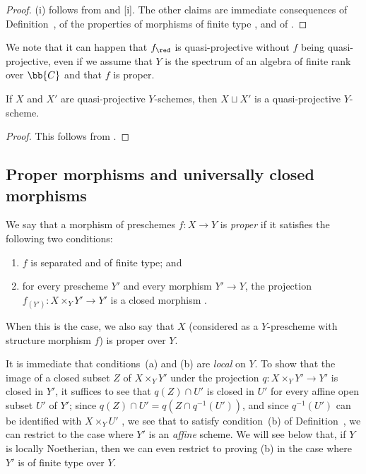 \begin{proof}
(i) follows from  and [i].
The other claims are immediate consequences of Definition~, of the properties of morphisms of finite type , and of .
\end{proof}

\begin{remark}[5.3.5]
\label{II.5.3.5}
We note that it can happen that $f_\red$ is quasi-projective without $f$ being quasi-projective, even if we assume that $Y$ is the spectrum of an algebra of finite rank over $\bb{C}$ and that $f$ is proper.
\end{remark}

\begin{corollary}[5.3.6]
\label{II.5.3.6}
If $X$ and $X'$ are quasi-projective $Y$-schemes, then $X\sqcup X'$ is a quasi-projective $Y$-scheme.
\end{corollary}

\begin{proof}
This follows from .
\end{proof}

\subsection{Proper morphisms and universally closed morphisms}
\label{subsection:II.5.4}

\begin{definition}[5.4.1]
\label{II.5.4.1}
We say that a morphism of preschemes $f:X\to Y$ is \emph{proper} if it satisfies the following two conditions:
\begin{enumerate}
  \item[(a)] $f$ is separated and of finite type; and
  \item[(b)] for every prescheme $Y'$ and every morphism $Y'\to Y$, the projection $f_{(Y')}:X\times_Y Y'\to Y'$ is a closed morphism .
\end{enumerate}

When this is the case, we also say that $X$ (considered as a $Y$-prescheme with structure morphism $f$) is proper over $Y$.
\end{definition}

It is immediate that conditions~(a) and (b) are \emph{local} on $Y$.
To show that the image of a closed subset $Z$ of $X\times_Y Y'$ under the projection $q:X\times_Y Y'\to Y'$ is closed in $Y'$, it suffices to see that $q(Z)\cap U'$ is closed in $U'$ for every affine open subset $U'$ of $Y'$;
since $q(Z)\cap U'=q(Z\cap q^{-1}(U'))$, and since $q^{-1}(U')$ can be identified with $X\times_Y U'$ , we see that to satisfy condition~(b) of Definition~, we can restrict to the case where $Y'$ is an \emph{affine} scheme.
We will see below  that, if $Y$ is locally Noetherian, then we can even restrict to proving (b) in the case where $Y'$ is of finite type over $Y$.

